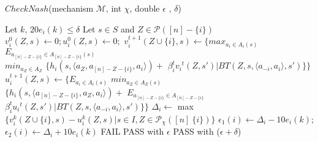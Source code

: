 \begin{algorithm}[H]
	\caption{$CheckNash$(mechanism $\mathcal{M}$, int $\chi$, double $\epsilon$ , $\delta$)}
	\label{checknash}
	\begin{algorithmic}[1]
			\STATE Let $k$, $20e_i(k) \leq \delta$
			\STATE Let $s \in S$ and $Z \in \mathcal{P}([n]-\{i\})$
			\STATE $v_{i}^{0}(Z,s) \leftarrow 0 ;  u_{i}^{0}(Z,s) \leftarrow 0 ;$
				\STATE	$v_{i}^{t+1}(Z \cup \{i\},s) \leftarrow
				\{max _{a_i \in A_i(s)}$
				$E_{a_{[n]-Z-\{i\}} \in A_{[n]-Z-\{i\}}(s)}$ \\
				$min_{a_{Z} \in A_{Z}}$ 
				$\{h_i(s,\langle a_{Z},a_{[n]-Z-\{i\}},a_{i} \rangle ) +$ $  \beta_i^{t}{v_i}^{t}(Z,s') | BT(Z,s,\langle a_{-i},a_i \rangle ,s')  \}\}
				$\\
				\STATE	$u_{i}^{t+1}(Z,s) \leftarrow
				\{E_{a_i \in A_i(s)}$
				$min_{a_{Z} \in A_{Z}(s)} $ \\ $\{h_i(s,\langle a_{[n]-Z-\{i\}},a_{Z},a_i \rangle ) +$
				$E_{a_{[n]-Z-\{i\}} \in A_{[n]-Z-\{i\}}}$
				$	\beta_i^{t}{u_i}^{t}(Z,s') | BT(Z,s,\langle a_{-i},a_i \rangle,s')  \} \}$				
			\ENDFOR
			\STATE	 $\Delta_i \leftarrow$ max$\{v_i^{k}(Z \cup \{i\},s) - u_i^{k}(Z,s) | s \in I, Z \in \mathcal{P}_\chi([n] \ \{i\})  \}$
			\STATE	 $\epsilon_1(i)  \leftarrow \Delta_i - 10e_i(k)$; $\epsilon_2(i)  \leftarrow \Delta_i + 10e_i(k)$
				\RETURN FAIL
			\ENDIF
		\ENDFOR
			\RETURN PASS with $\epsilon$
		\ELSE
			\RETURN PASS with ($\epsilon + \delta$)
		\ENDIF
	\end{algorithmic}
\end{algorithm}

